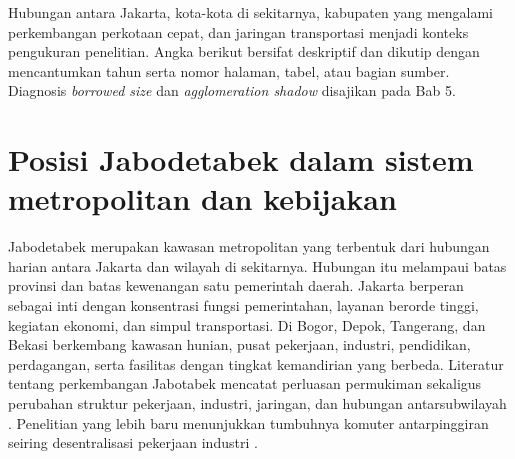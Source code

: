 \documentclass[12pt,a4paper,oneside,openany,indonesian]{report}
\begin{document}
Hubungan antara Jakarta, kota-kota di sekitarnya, kabupaten yang mengalami perkembangan perkotaan cepat, dan jaringan transportasi menjadi konteks pengukuran penelitian. Angka berikut bersifat deskriptif dan dikutip dengan mencantumkan tahun serta nomor halaman, tabel, atau bagian sumber. Diagnosis \emph{borrowed size} dan \emph{agglomeration shadow} disajikan pada Bab 5.

\section{Posisi Jabodetabek dalam sistem metropolitan dan kebijakan}

Jabodetabek merupakan kawasan metropolitan yang terbentuk dari hubungan harian antara Jakarta dan wilayah di sekitarnya. Hubungan itu melampaui batas provinsi dan batas kewenangan satu pemerintah daerah. Jakarta berperan sebagai inti dengan konsentrasi fungsi pemerintahan, layanan berorde tinggi, kegiatan ekonomi, dan simpul transportasi. Di Bogor, Depok, Tangerang, dan Bekasi berkembang kawasan hunian, pusat pekerjaan, industri, pendidikan, perdagangan, serta fasilitas dengan tingkat kemandirian yang berbeda. Literatur tentang perkembangan Jabotabek mencatat perluasan permukiman sekaligus perubahan struktur pekerjaan, industri, jaringan, dan hubungan antarsubwilayah \parencite{henderson1996,hudalahfirman2012,hudalahetal2013}. Penelitian yang lebih baru menunjukkan tumbuhnya komuter antarpinggiran seiring desentralisasi pekerjaan industri \parencite{sadewoetal2023,aritenang2023}.
\end{document}
